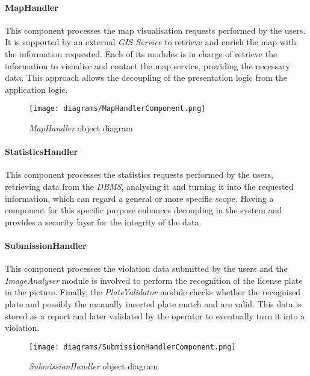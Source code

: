 \paragraph{MapHandler}
This component processes the map visualisation requests performed by the users. It is supported by an external \textit{GIS Service} to retrieve and enrich the map with the information requested. Each of its modules is in charge of retrieve the information to visualise and contact the map service, providing the necessary data. This approach allows the decoupling of the presentation logic from the application logic.\newline\newline
\begin{figure}[h!]
	\centering
	\texttt{[image: diagrams/MapHandlerComponent.png]}
	\caption{
		\label{fig:mapHandlerComponentDiagram} 
		\emph{MapHandler} object diagram
	}
\end{figure}
\paragraph{StatisticsHandler}
This component processes the statistics requests performed by the users, retrieving data from the \textit{DBMS}, analysing it and turning it into the requested information, which can regard a general or more specific scope. Having a component for this specific purpose enhances decoupling in the system and provides a security layer for the integrity of the data.
\clearpage\paragraph{SubmissionHandler}
This component processes the violation data submitted by the users and the \textit{ImageAnalyser} module is involved to perform the recognition of the license plate in the picture. Finally, the \textit{PlateValidator} module checks whether the recognised plate and possibly the manually inserted plate match and are valid. This data is stored as a report and later validated by the operator to eventually turn it into a violation.\newline\newline
\begin{figure}[h!]
	\centering
	\texttt{[image: diagrams/SubmissionHandlerComponent.png]}
	\caption{
		\label{fig:submissionHandlerComponentDiagram} 
		\emph{SubmissionHandler} object diagram
	}
\end{figure}
